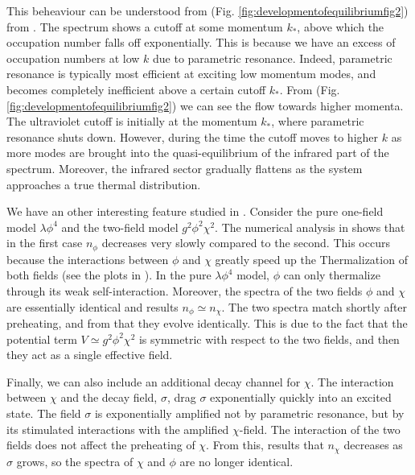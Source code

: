 \documentclass[11pt,a4paper,twoside]{book}
\begin{document}
This beheaviour can be understood from (Fig. \ref{fig:developmentofequilibriumfig2}) from \cite{Chap6:DevelopmentEquilibrium}. The spectrum shows a cutoff at some momentum $ k_{*} $, above which the occupation number falls off exponentially.  This is because we have an excess of occupation numbers at low $ k $ due to parametric resonance. Indeed, parametric resonance is typically most efficient at exciting low momentum modes, and becomes completely inefficient above a certain cutoff $ k_{*} $. From (Fig. \ref{fig:developmentofequilibriumfig2}) we can see the flow towards higher momenta. The ultraviolet cutoff is initially at the momentum $ k_{*} $, where parametric resonance shuts down. However, during the time the cutoff moves to higher $ k $ as more modes are brought into the quasi-equilibrium of the infrared part of the spectrum. Moreover, the infrared sector  gradually flattens as the system approaches a true thermal distribution.

We have an other interesting feature  studied in \cite{Chap6:DevelopmentEquilibrium}. Consider the pure one-field model $ \lambda \phi^{4} $ and the two-field model $ g^{2}\phi^{2}\chi^{2} $. The numerical analysis in \cite{Chap6:DevelopmentEquilibrium} shows that in the first case $ n_{\phi} $ decreases very slowly compared to the second. This occurs because  the interactions between $\phi$ and $\chi$ greatly speed up the Thermalization of both fields (see the plots in \cite{Chap6:DevelopmentEquilibrium}). In the pure $ \lambda \phi^{4} $ model, $\phi$ can only thermalize through its weak self-interaction. Moreover, the spectra of the two fields $\phi$ and $\chi$ are essentially identical and results $ n_{\phi} \simeq n_{\chi} $. The two spectra match shortly after preheating, and from that they evolve identically. This is due to the fact that the potential term $ V\simeq g^{2}\phi^{2}\chi^{2} $ is symmetric with respect to the two fields, and then they act as a single effective field.

Finally, we can also include an additional decay channel for $\chi$. The interaction between $\chi$ and the decay field, $\sigma$, drag $\sigma$ exponentially quickly into an excited state. The field $\sigma$ is exponentially amplified not by parametric resonance, but by its stimulated interactions with the amplified $\chi$-field. The interaction of the two fields does not affect the preheating of $\chi$. From this, results that $ n_{\chi} $ decreases as $\sigma$ grows, so the spectra of $\chi$ and $\phi$ are no longer identical.
\end{document}
